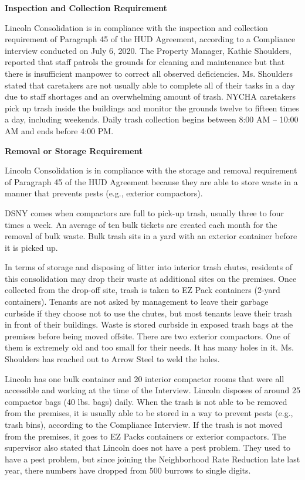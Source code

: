 
\textbf{Inspection and Collection Requirement} 

Lincoln Consolidation is in compliance with the inspection and collection requirement of Paragraph 45 of the HUD Agreement, according to a Compliance interview conducted on July 6, 2020. The Property Manager, Kathie Shoulders, reported that staff patrols the grounds for cleaning and maintenance but that  there is insufficient manpower to correct all observed deficiencies. Ms. Shoulders stated that caretakers are not usually able to complete all of their tasks in a day due to staff shortages and an overwhelming amount of trash.  NYCHA caretakers pick up trash inside the buildings and monitor the grounds twelve to fifteen times a day, including weekends. Daily trash collection begins between 8:00 AM -- 10:00 AM and ends before 4:00 PM. 

 

\textbf{Removal or Storage Requirement} 

Lincoln Consolidation is in compliance with the storage and removal requirement of Paragraph 45 of the HUD Agreement because they are able to store waste in a manner that prevents pests (e.g., exterior compactors).

DSNY comes when compactors are full to pick-up trash, usually three to four times a week. An average of ten bulk tickets are created each month for the removal of bulk waste. Bulk trash sits in a yard with an exterior container before it is picked up.  

 

In terms of storage and disposing of litter into interior trash chutes, residents of this consolidation may drop their waste at additional sites on the premises. Once collected from the drop-off site, trash is taken to EZ Pack containers (2-yard containers). Tenants are not asked by management to leave their garbage curbside if they choose not to use the chutes, but most tenants leave their trash in front of their buildings. Waste is stored curbside in exposed trash bags at the premises before being moved offsite. There are two exterior compactors. One of them is extremely old and too small for their needs. It has many holes in it. Ms. Shoulders has reached out to Arrow Steel to weld the holes. 

 

Lincoln has one bulk container and 20 interior compactor rooms that were all accessible and working at the time of the Interview. Lincoln disposes of around 25 compactor bags (40 lbs. bags) daily. When the trash is not able to be removed from the premises, it is  usually able to be stored in a way to prevent pests (e.g., trash bins), according to the Compliance Interview. If the trash is not moved from the premises, it goes to EZ Packs containers or exterior compactors. The supervisor also stated that Lincoln does not have a pest problem. They used to have a pest problem, but since joining the Neighborhood Rate Reduction late last year, there numbers have dropped from 500 burrows to single digits.  

